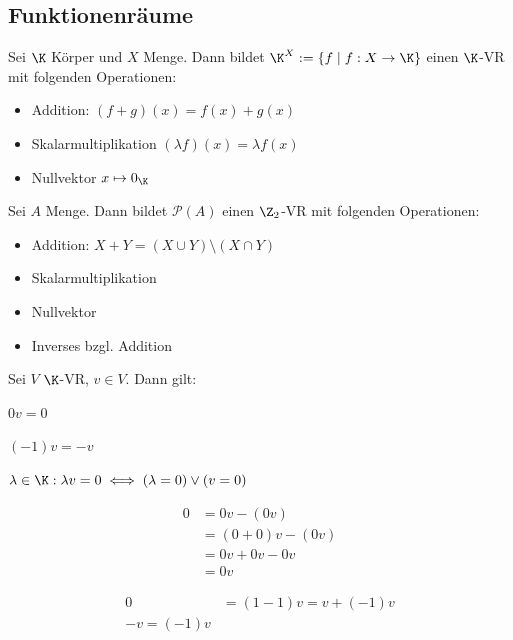 \subsection{Funktionenräume}
\begin{definition}
	Sei $\K$ Körper und $X$ Menge. Dann bildet $\K^X := \{f\mid f:X\to \K\}$ einen $\K$-VR mit folgenden Operationen:
	\begin{itemize}
		\item Addition: $(f+g)(x)=f(x)+g(x)$
		\item Skalarmultiplikation $(\lambda f)(x)=\lambda f(x)$
		\item Nullvektor $x\mapsto 0_{\K}$
	\end{itemize}
\end{definition}
\begin{example}
	Sei $A$ Menge. Dann bildet $\mathcal{P}(A)$ einen $\Z_2$-VR mit folgenden Operationen:
	\begin{itemize}
		\item Addition: $X+Y=(X\cup Y)\setminus(X\cap Y)$
		\item Skalarmultiplikation
		\item Nullvektor
		\item Inverses bzgl. Addition
	\end{itemize}
\end{example}
\begin{lemma}
	Sei $V$ $\K$-VR, $v \in V$. Dann gilt:
	\begin{enumerateroman}
		\item $0v=0$
		\item $(-1)v=-v$
		\item $\lambda \in \K: \lambda v=0 \iff (\lambda=0)\lor (v=0)$
	\end{enumerateroman}
\end{lemma}
\prove
\begin{enumerateroman}
	\item \begin{align*}
		0&= 0v-(0v)\\
		&=(0+0)v-(0v)\\
		&= 0v+0v-0v\\
		&=0v
	\end{align*}
	\item \begin{align*}
		0&=(1-1)v=v+(-1)v\\
		-v=(-1)v
	\end{align*}
\end{enumerateroman}
